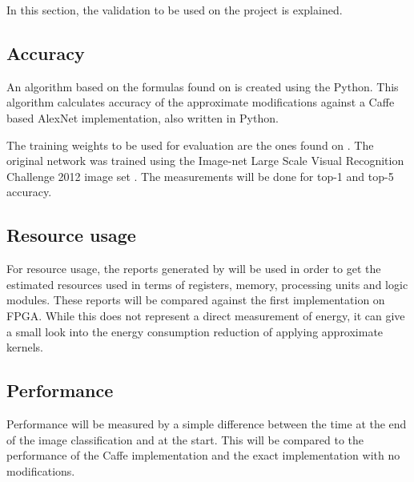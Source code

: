 In this section, the validation to be used on the project is explained.

\subsection{Accuracy}

An algorithm based on the formulas found on \cite{googledev} is created using the Python. This algorithm
calculates accuracy of the approximate modifications against a Caffe \cite{jia2014caffe} based AlexNet implementation,
also written in Python.

The training weights to be used for evaluation are the ones found on \cite{donahue2012bvlc}. The original network
was trained using the Image-net Large Scale Visual Recognition Challenge 2012 image set \cite{lsvrc}.
The measurements will be done for top-1 and top-5 accuracy.

\subsection{Resource usage}

For resource usage, the reports generated by \intelOCL will be used in order to get the estimated
resources used in terms of registers, memory, processing units and logic modules.
These reports will be compared against the first implementation on FPGA.
While this does not represent a direct measurement of energy, it can give a small look
into the energy consumption reduction of applying approximate kernels.

\subsection{Performance}

Performance will be measured by a simple difference between the time 
at the end of the image classification and at the start.
This will be compared to the performance of the Caffe implementation 
and the exact implementation with no modifications.